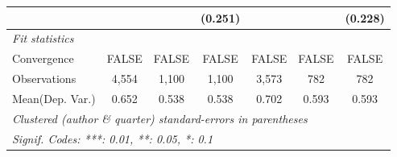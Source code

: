 \begin{tabular}{lcccccc}
                           &               &             & (0.251) &               &         & (0.228)\\   
   \midrule
   \emph{Fit statistics}\\
   Convergence             &FALSE          & FALSE       & FALSE   & FALSE         & FALSE   & FALSE\\  
   Observations            & 4,554         & 1,100       & 1,100   & 3,573         & 782     & 782\\  
Mean(Dep. Var.) & 0.652 & 0.538 & 0.538 & 0.702 & 0.593 & 0.593 \\
   \midrule \midrule
   \multicolumn{7}{l}{\emph{Clustered (author \& quarter) standard-errors in parentheses}}\\
   \multicolumn{7}{l}{\emph{Signif. Codes: ***: 0.01, **: 0.05, *: 0.1}}\\
\end{tabular}
\par\endgroup
